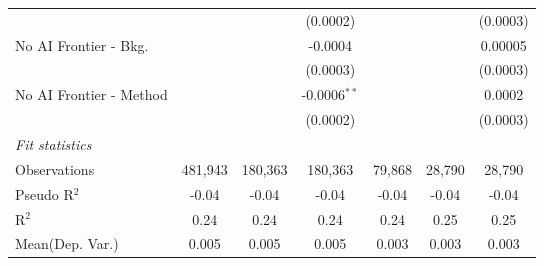 \begin{tabular}{lcccccc}
                           &          &          & (0.0002)       &                &          & (0.0003)\\   
   No AI Frontier - Bkg.   &          &          & -0.0004        &                &          & 0.00005\\   
                           &          &          & (0.0003)       &                &          & (0.0003)\\   
   No AI Frontier - Method &          &          & -0.0006$^{**}$ &                &          & 0.0002\\   
                           &          &          & (0.0002)       &                &          & (0.0003)\\   
   \midrule
   \emph{Fit statistics}\\
   Observations            & 481,943  & 180,363  & 180,363        & 79,868         & 28,790   & 28,790\\  
   Pseudo R$^2$            & -0.04    & -0.04    & -0.04          & -0.04          & -0.04    & -0.04\\  
   R$^2$                   & 0.24     & 0.24     & 0.24           & 0.24           & 0.25     & 0.25\\  
Mean(Dep. Var.) & 0.005 & 0.005 & 0.005 & 0.003 & 0.003 & 0.003 \\
   

\end{tabular}
